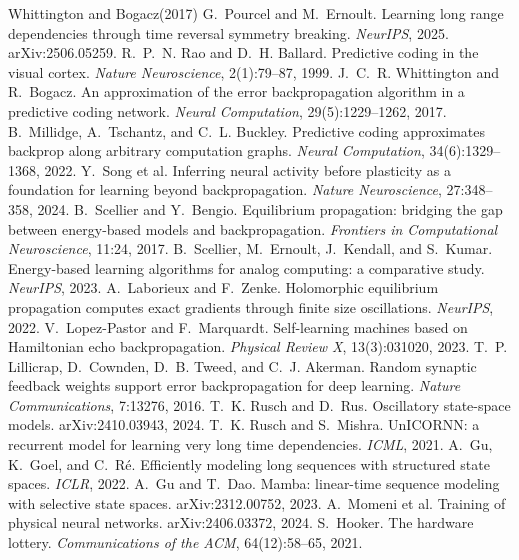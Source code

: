 \documentclass[10pt]{article}
\theoremstyle{remark}
\begin{document}
\small
\begin{thebibliography}{Whittington and Bogacz(2017)}
 G.~Pourcel and M.~Ernoult. Learning
long range dependencies through time reversal symmetry breaking.
\emph{NeurIPS}, 2025. arXiv:2506.05259.
 R.~P.~N. Rao and D.~H. Ballard.
Predictive coding in the visual cortex. \emph{Nature Neuroscience},
2(1):79--87, 1999.
 J.~C.~R. Whittington
and R.~Bogacz. An approximation of the error backpropagation algorithm in a
predictive coding network. \emph{Neural Computation}, 29(5):1229--1262, 2017.
 B.~Millidge, A.~Tschantz, and
C.~L. Buckley. Predictive coding approximates backprop along arbitrary
computation graphs. \emph{Neural Computation}, 34(6):1329--1368, 2022.
 Y.~Song et al. Inferring neural
activity before plasticity as a foundation for learning beyond
backpropagation. \emph{Nature Neuroscience}, 27:348--358, 2024.
 B.~Scellier and Y.~Bengio.
Equilibrium propagation: bridging the gap between energy-based models and
backpropagation. \emph{Frontiers in Computational Neuroscience}, 11:24, 2017.
 B.~Scellier, M.~Ernoult,
J.~Kendall, and S.~Kumar. Energy-based learning algorithms for analog
computing: a comparative study. \emph{NeurIPS}, 2023.
 A.~Laborieux and F.~Zenke.
Holomorphic equilibrium propagation computes exact gradients through finite
size oscillations. \emph{NeurIPS}, 2022.
 V.~Lopez-Pastor and
F.~Marquardt. Self-learning machines based on Hamiltonian echo
backpropagation. \emph{Physical Review X}, 13(3):031020, 2023.
 T.~P. Lillicrap,
D.~Cownden, D.~B. Tweed, and C.~J. Akerman. Random synaptic feedback weights
support error backpropagation for deep learning. \emph{Nature
Communications}, 7:13276, 2016.
 T.~K. Rusch and D.~Rus. Oscillatory
state-space models. arXiv:2410.03943, 2024.
 T.~K. Rusch and S.~Mishra.
UnICORNN: a recurrent model for learning very long time dependencies.
\emph{ICML}, 2021.
 A.~Gu, K.~Goel, and C.~R\'e. Efficiently
modeling long sequences with structured state spaces. \emph{ICLR}, 2022.
 A.~Gu and T.~Dao. Mamba: linear-time
sequence modeling with selective state spaces. arXiv:2312.00752, 2023.
 A.~Momeni et al. Training of physical
neural networks. arXiv:2406.03372, 2024.
 S.~Hooker. The hardware lottery.
\emph{Communications of the ACM}, 64(12):58--65, 2021.
\end{thebibliography}
\end{document}
